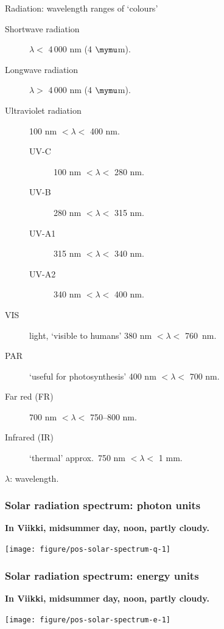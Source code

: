 \documentclass[10pt]{beamer}\usepackage[]{graphicx}\usepackage[]{color}
\newenvironment{knitrout}{}{} %
\begin{document}
\begin{frame}{Radiation: wavelength ranges of `colours'}
    \begin{description}
        \item[Shortwave radiation] $\lambda <$ 4\,000 nm (4 $\mymu$m).
        \item[Longwave radiation] $\lambda >$ 4\,000 nm (4 $\mymu$m).
        \item[Ultraviolet radiation] 100 nm $ < \lambda <$ 400 nm.
        \begin{description}
            \item[UV-C] 100 nm $< \lambda <$ 280 nm.
            \item[UV-B] 280 nm $< \lambda <$ 315 nm.
            \item[UV-A1] 315 nm $< \lambda <$ 340 nm.
            \item[UV-A2] 340 nm $< \lambda <$ 400 nm.
        \end{description}
        \item[VIS] light, `visible to humans' 380 nm $< \lambda <$ 760~nm.
        \item[PAR] `useful for photosynthesis' 400 nm $< \lambda <$ 700 nm.
        \item[Far red (FR)] 700 nm $< \lambda <$ 750--800 nm.
        \item[Infrared (IR)] `thermal' approx.\ 750 nm $< \lambda <$ 1 mm.
    \end{description}
    \small{$\lambda$: wavelength.}
\end{frame}

\begin{frame}
  \frametitle{Solar radiation spectrum: photon units}

  \textbf{In Viikki, midsummer day, noon, partly cloudy.}

\begin{knitrout}\tiny
{}\color{fgcolor}

{\centering \texttt{[image: figure/pos-solar-spectrum-q-1]} 

}


\end{knitrout}
\end{frame}

\begin{frame}
  \frametitle{Solar radiation spectrum: energy units}

  \textbf{In Viikki, midsummer day, noon, partly cloudy.}

\begin{knitrout}\tiny
{}\color{fgcolor}

{\centering \texttt{[image: figure/pos-solar-spectrum-e-1]} 

}


\end{knitrout}
\end{frame}
\end{document}
